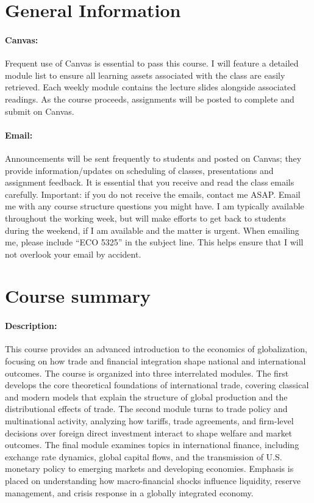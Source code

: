 \documentclass[10pt]{article}
\begin{document}
\section*{General Information}

\paragraph{Canvas:} Frequent use of Canvas is essential to pass this course. 
I will feature a detailed module list to ensure all learning assets associated with the class are easily retrieved.   
Each weekly module contains the lecture slides alongside associated readings.
As the course proceeds, assignments will be posted to complete and submit on Canvas. 

\paragraph{Email:} Announcements will be sent frequently to students and posted on Canvas; they provide information/updates on scheduling of classes, presentations and assignment feedback. 
It is essential that you receive and read the class emails carefully.  
Important: if you do not receive the emails, contact me ASAP. 
Email me with any course structure questions you might have.  
I am typically available throughout the working week, but will make efforts to get back to students during the weekend, if I am available and the matter is urgent. 
When emailing me, please include ``ECO 5325” in the subject line. 
This helps ensure that I will not overlook your email by accident. 


\newpage



\section*{Course summary}

\paragraph{Description:} This course provides an advanced introduction to the economics of globalization, focusing on how trade and financial integration shape national and international outcomes. 
The course is organized into three interrelated modules. 
The first develops the core theoretical foundations of international trade, covering classical and modern models that explain the structure of global production and the distributional effects of trade. 
The second module turns to trade policy and multinational activity, analyzing how tariffs, trade agreements, and firm-level decisions over foreign direct investment interact to shape welfare and market outcomes. 
The final module examines topics in international finance, including exchange rate dynamics, global capital flows, and the transmission of U.S. monetary policy to emerging markets and developing economies. 
Emphasis is placed on understanding how macro-financial shocks influence liquidity, reserve management, and crisis response in a globally integrated economy. 
\end{document}
